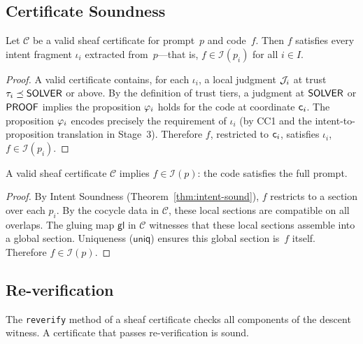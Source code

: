 \documentclass[11pt]{article}
\newcommand{\IntentSheaf}{\mathcal{I}}
\newcommand{\ProofCert}{\mathcal{C}}
\newcommand{\IntentFrag}{\iota}
\newcommand{\GlueMap}{\mathsf{gl}}
\newcommand{\UniqWit}{\mathsf{uniq}}
\begin{document}
\subsection{Certificate Soundness}\label{sec:soundness}

\begin{theorem}\label{thm:intent-sound}
Let $\ProofCert$ be a valid sheaf certificate for prompt~$p$ and
code~$f$.  Then $f$ satisfies every intent fragment
$\IntentFrag_i$ extracted from~$p$---that is,
$f \in \IntentSheaf(p_i)$ for all $i \in I$.
\end{theorem}

\begin{proof}
A valid certificate contains, for each $\IntentFrag_i$, a local
judgment $\mathcal{J}_i$ at trust $\tau_i \preceq \mathsf{SOLVER}$ or above.  By the
definition of trust tiers, a judgment at $\mathsf{SOLVER}$ or $\mathsf{PROOF}$
implies the proposition $\varphi_i$ holds for the code at coordinate
$\mathsf{c}_i$.  The proposition $\varphi_i$ encodes precisely the
requirement of $\IntentFrag_i$ (by CC1 and the intent-to-proposition
translation in Stage~3).  Therefore $f$, restricted to $\mathsf{c}_i$,
satisfies $\IntentFrag_i$, \ie $f \in \IntentSheaf(p_i)$.
\end{proof}

\begin{theorem}\label{thm:global-sound}
A valid sheaf certificate $\ProofCert$ implies
$f \in \IntentSheaf(p)$: the code satisfies the full prompt.
\end{theorem}

\begin{proof}
By Intent Soundness (Theorem~\ref{thm:intent-sound}), $f$ restricts
to a section over each $p_i$.  By the cocycle data in $\ProofCert$,
these local sections are compatible on all overlaps.  The gluing map
$\GlueMap$ in $\ProofCert$ witnesses that these local sections
assemble into a global section.  Uniqueness ($\UniqWit$) ensures
this global section is~$f$ itself.  Therefore
$f \in \IntentSheaf(p)$.
\end{proof}

\subsection{Re-verification}\label{sec:reverify}

\begin{proposition}\label{prop:reverify}
The \texttt{reverify} method of a sheaf certificate checks all
components of the descent witness.  A certificate that passes
re-verification is sound.
\end{proposition}
\end{document}
